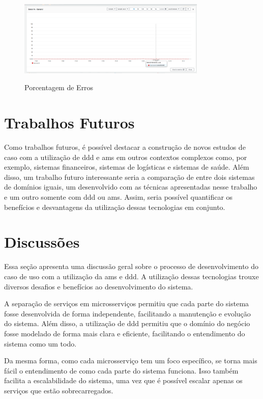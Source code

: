\begin{figure}[H]
    \centering
    \caption{Porcentagem de Erros}
    \includegraphics[width=0.8\textwidth]{media/errors.png}
    \label{fig:error-rate}
\end{figure}

\section{Trabalhos Futuros}
Como trabalhos futuros, é possível destacar a construção de novos estudos de caso com a utilização de \acrshort{ddd} e \acrshort{ams} em outros contextos complexos como, por exemplo, sistemas financeiros, sistemas de logísticas e sistemas de saúde. Além disso, um trabalho futuro interessante seria a comparação de entre dois sistemas de domínios iguais, um desenvolvido com as técnicas apresentadas nesse trabalho e um outro somente com \acrshort{ddd} ou \acrshort{ams}. Assim, seria possível quantificar os benefícios e desvantagens da utilização dessas tecnologias em conjunto.

\section{Discussões}
Essa seção apresenta uma discussão geral sobre o processo de desenvolvimento do caso de uso com a utilização da \acrshort{ams} e \acrshort{ddd}. A utilização dessas tecnologias trouxe diversos desafios e benefícios ao desenvolvimento do sistema.

A separação de serviços em microsserviços permitiu que cada parte do sistema fosse desenvolvida de forma independente, facilitando a manutenção e evolução do sistema. Além disso, a utilização de \acrshort{ddd} permitiu que o domínio do negócio fosse modelado de forma mais clara e eficiente, facilitando o entendimento do sistema como um todo.

Da mesma forma, como cada microsserviço tem um foco específico, se torna mais fácil o entendimento de como cada parte do sistema funciona. Isso também facilita a escalabilidade do sistema, uma vez que é possível escalar apenas os serviços que estão sobrecarregados.


